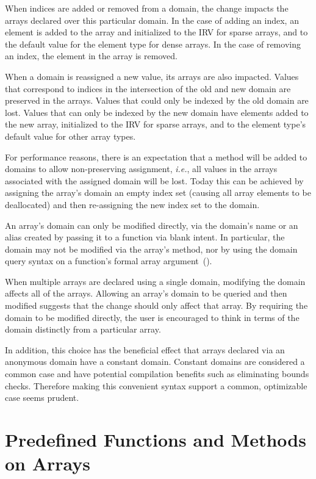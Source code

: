 When indices are added or removed from a domain, the change impacts
the arrays declared over this particular domain.  In the case of
adding an index, an element is added to the array and initialized to
the IRV for sparse arrays, and to the default value for the element
type for dense arrays.  In the case of removing an index, the element
in the array is removed.

When a domain is reassigned a new value, its arrays are also impacted.
Values that correspond to indices in the intersection of the old and
new domain are preserved in the arrays.  Values that could only be
indexed by the old domain are lost.  Values that can only be indexed
by the new domain have elements added to the new array, initialized to
the IRV for sparse arrays, and to the element type's default value for
other array types.

For performance reasons, there is an expectation that a method will be
added to domains to allow non-preserving assignment, \emph{i.e.}, all
values in the arrays associated with the assigned domain will be lost.
Today this can be achieved by assigning the array's domain an empty
index set (causing all array elements to be deallocated) and then
re-assigning the new index set to the domain.

An array's domain can only be modified directly, via the domain's name
or an alias created by passing it to a function via blank intent.  In
particular, the domain may not be modified via the array's
 method, nor by using the domain query syntax on a
function's formal array
argument~().

\begin{rationale}
When multiple arrays are declared using a single domain, modifying the
domain affects all of the arrays.  Allowing an array's domain to be
queried and then modified suggests that the change should only affect
that array.  By requiring the domain to be modified directly, the user
is encouraged to think in terms of the domain distinctly from a
particular array.

In addition, this choice has the beneficial effect that arrays
declared via an anonymous domain have a constant domain.  Constant
domains are considered a common case and have potential compilation
benefits such as eliminating bounds checks.  Therefore making this
convenient syntax support a common, optimizable case seems prudent.
\end{rationale}


\section{Predefined Functions and Methods on Arrays}
\label{Predefined_Functions_and_Methods_on_Arrays}

